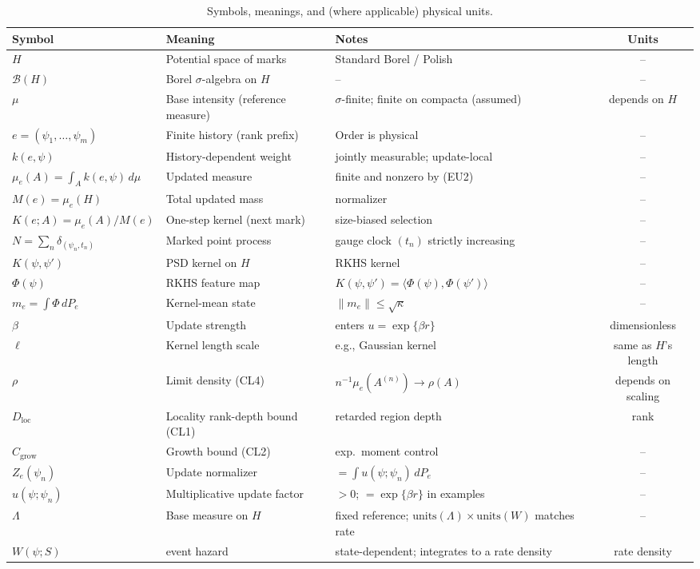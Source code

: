 \documentclass[12pt,a4paper]{article}
\begin{document}
\begin{table}[t]
\centering
\caption{Symbols, meanings, and (where applicable) physical units.}
\label{tab:symbols}
\begin{tabular}{@{}lllc@{}}
\toprule
\textbf{Symbol} & \textbf{Meaning} & \textbf{Notes} & \textbf{Units} \\
\midrule
$H$ & Potential space of marks & Standard Borel / Polish & -- \\
$\mathcal B(H)$ & Borel $\sigma$-algebra on $H$ & -- & -- \\
$\mu$ & Base intensity (reference measure) & $\sigma$-finite; finite on compacta (assumed) & depends on $H$ \\
$e=(\psi_1,\dots,\psi_m)$ & Finite history (rank prefix) & Order is physical & -- \\
$k(e,\psi)$ & History-dependent weight & jointly measurable; update-local & -- \\
$\mu_e(A)=\int_A k(e,\psi)\,d\mu$ & Updated measure & finite and nonzero by (EU2) & -- \\
$M(e)=\mu_e(H)$ & Total updated mass & normalizer & -- \\
$K(e;A)=\mu_e(A)/M(e)$ & One-step kernel (next mark) & size-biased selection & -- \\
$N=\sum_n\delta_{(\psi_n,t_n)}$ & Marked point process & gauge clock $(t_n)$ strictly increasing & -- \\
$K(\psi,\psi')$ & PSD kernel on $H$ & RKHS kernel & -- \\
$\Phi(\psi)$ & RKHS feature map & $K(\psi,\psi')=\langle\Phi(\psi),\Phi(\psi')\rangle$ & -- \\
$m_e=\int \Phi\,dP_e$ & Kernel-mean state & $\|m_e\|\le\sqrt{\kappa}$ & -- \\
$\beta$ & Update strength & enters $u=\exp\{\beta r\}$ & dimensionless \\
$\ell$ & Kernel length scale & e.g., Gaussian kernel & same as $H$'s length \\
$\rho$ & Limit density (CL4) & $n^{-1}\mu_e(A^{(n)})\to \rho(A)$ & depends on scaling \\
$D_{\mathrm{loc}}$ & Locality rank-depth bound (CL1) & retarded region depth & rank \\
$C_{\mathrm{grow}}$ & Growth bound (CL2) & exp.\ moment control & -- \\
$Z_e(\psi_n)$ & Update normalizer & $=\int u(\psi;\psi_n)\,dP_e$ & -- \\
$u(\psi;\psi_n)$ & Multiplicative update factor & $>0$; $=\exp\{\beta r\}$ in examples & -- \\
$\Lambda$ & Base measure on $H$ & fixed reference; $\mathrm{units}(\Lambda)\!\times\!\mathrm{units}(W)$ matches rate & -- \\
$W(\psi;S)$ & event hazard & state-dependent; integrates to a rate density & rate density \\

\bottomrule
\end{tabular}
\end{table}
\end{document}
